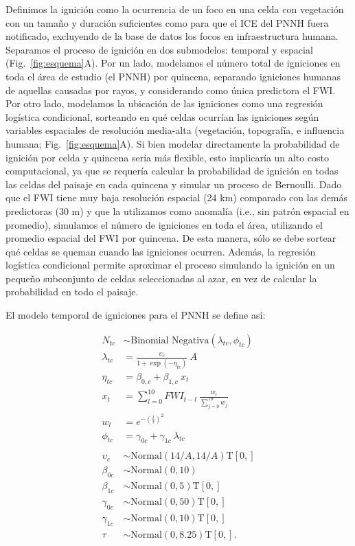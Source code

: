 Definimos la ignición como la ocurrencia de un foco en una celda con vegetación con un tamaño y duración suficientes como para que el ICE del PNNH fuera notificado, excluyendo de la base de datos los focos en infraestructura humana. Separamos el proceso de ignición en dos submodelos: temporal y espacial (Fig.~\ref{fig:esquema}A). Por un lado, modelamos el número total de igniciones en toda el área de estudio (el PNNH) por quincena, separando igniciones humanas de aquellas causadas por rayos, y considerando como única predictora el FWI. Por otro lado, modelamos la ubicación de las igniciones como una regresión logística condicional, sorteando en qué celdas ocurrían las igniciones según variables espaciales de resolución media-alta (vegetación, topografía, e influencia humana; Fig.~\ref{fig:esquema}A). Si bien modelar directamente la probabilidad de ignición por celda y quincena sería más flexible, esto implicaría un alto costo computacional, ya que se requería calcular la probabilidad de ignición en todas las celdas del paisaje en cada quincena y simular un proceso de Bernoulli. Dado que el FWI tiene muy baja resolución espacial (24 km) comparado con las demás predictoras (30 m) y que la utilizamos como anomalía (i.e., sin patrón espacial en promedio), simulamos el número de igniciones en toda el área, utilizando el promedio espacial del FWI por quincena. De esta manera, sólo se debe sortear qué celdas se queman cuando las igniciones ocurren. Además, la regresión logística condicional permite aproximar el proceso simulando la ignición en un pequeño subconjunto de celdas seleccionadas al azar, en vez de calcular la probabilidad en todo el paisaje.

El modelo temporal de igniciones para el PNNH se define así:

\begin{equation}
\label{eq:igrate}
\begin{aligned}
    N_{tc} &\sim \text{Binomial Negativa}(\lambda_{tc}, \phi_{tc}) \\
    \lambda_{tc} &= \frac{\upsilon_c}{1 + \exp{(-\eta_{tc})}} \ A\\
    \eta_{tc} &= \beta_{0,c} + \beta_{1,c} \ x_t \\
    x_t &= \sum_{l=0}^{10} FWI_{t-l} \ \frac{w_l}{\sum_{j=0}^{10} w_j}\\
    w_l &= e^{-\left(\frac{l}{\tau}\right)^2}\\
    \phi_{tc} &= \gamma_{0c} + \gamma_{1c} \ \lambda_{tc} \\ 
    \\
    \upsilon_c &\sim \text{Normal}(14/A, 14/A)\text{T}[0, ] \\ 
    \beta_{0c} &\sim \text{Normal}(0, 10) \\
    \beta_{1c} &\sim \text{Normal}(0, 5)\text{T}[0, ] \\
    \gamma_{0c} &\sim \text{Normal}(0, 50)\text{T}[0, ] \\
    \gamma_{1c} &\sim \text{Normal}(0, 10)\text{T}[0, ] \\
    \tau &\sim \text{Normal}(0, 8.25)\text{T}[0, ]. 
\end{aligned}
\end{equation}

